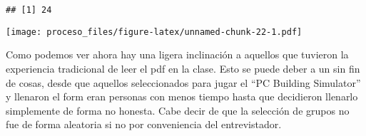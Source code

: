 \documentclass[
]{article}
\newenvironment{Shaded}{\begin{snugshade}}{\end{snugshade}}
\newcommand{\AttributeTok}[1]{\textcolor[rgb]{0.77,0.63,0.00}{#1}}
\newcommand{\FunctionTok}[1]{\textcolor[rgb]{0.00,0.00,0.00}{#1}}
\newcommand{\NormalTok}[1]{#1}
\newcommand{\OtherTok}[1]{\textcolor[rgb]{0.56,0.35,0.01}{#1}}
\newcommand{\SpecialCharTok}[1]{\textcolor[rgb]{0.00,0.00,0.00}{#1}}
\newcommand{\StringTok}[1]{\textcolor[rgb]{0.31,0.60,0.02}{#1}}
\begin{document}
\begin{Shaded}
\end{Shaded}

\begin{verbatim}
## [1] 24
\end{verbatim}

\begin{Shaded}
\end{Shaded}

\texttt{[image: proceso\_files/figure-latex/unnamed-chunk-22-1.pdf]}

Como podemos ver ahora hay una ligera inclinación a aquellos que
tuvieron la experiencia tradicional de leer el pdf en la clase. Esto se
puede deber a un sin fin de cosas, desde que aquellos seleccionados para
jugar el ``PC Building Simulator'' y llenaron el form eran personas con
menos tiempo hasta que decidieron llenarlo simplemente de forma no
honesta. Cabe decir de que la selección de grupos no fue de forma
aleatoria si no por conveniencia del entrevistador.
\end{document}
